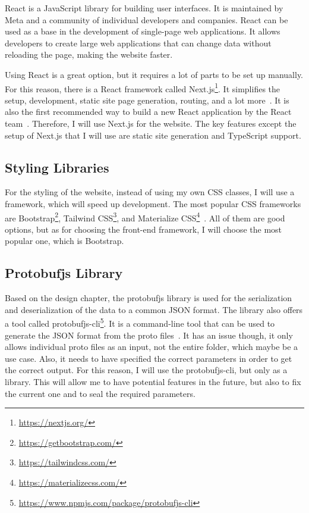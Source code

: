 React is a JavaScript library for building user interfaces.
It is maintained by Meta and a community of individual developers and companies.
React can be used as a base in the development of single-page web applications.
It allows developers to create large web applications that can change data without reloading the page, making the website faster.
\cite{react}

Using React is a great option, but it requires a lot of parts to be set up manually.
For this reason, there is a React framework called Next.js\footnote{\url{https://nextjs.org/}}.
It simplifies the setup, development, static site page generation, routing, and a lot more~\cite{nextjs}.
It is also the first recommended way to build a new React application by the React team~\cite{react-start-new-project}.
Therefore, I will use Next.js for the website.
The key features except the setup of Next.js that I will use are static site generation and TypeScript support.

\subsection{Styling Libraries}
For the styling of the website, instead of using my own CSS classes, I will use a framework, which will speed up development.
The most popular CSS frameworks are Bootstrap\footnote{\url{https://getbootstrap.com/}}, Tailwind CSS\footnote{\url{https://tailwindcss.com/}}, and Materialize CSS\footnote{\url{https://materializecss.com/}}~\cite{state-of-css-frameworks}.
All of them are good options, but as for choosing the front-end framework, I will choose the most popular one, which is Bootstrap.

\subsection{Protobufjs Library}
Based on the design chapter, the protobufjs library is used for the serialization and deserialization of the data to a common JSON format.
The library also offers a tool called protobufjs-cli\footnote{\url{https://www.npmjs.com/package/protobufjs-cli}}.
It is a command-line tool that can be used to generate the JSON format from the proto files~\cite{protobufjs-cli}.
It has an issue though, it only allows individual proto files as an input, not the entire folder, which maybe be a use case.
Also, it needs to have specified the correct parameters in order to get the correct output.
For this reason, I will use the protobufjs-cli, but only as a library.
This will allow me to have potential features in the future, but also to fix the current one and to seal the required parameters.

